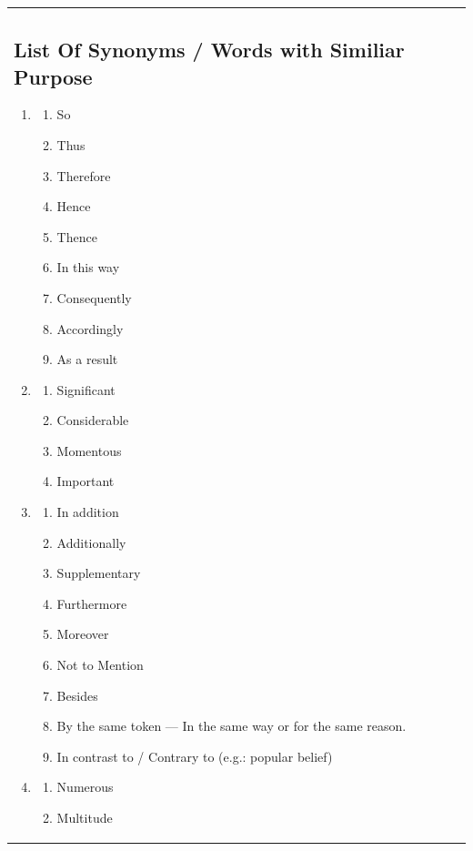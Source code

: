 \documentclass[oneside]{book}
\begin{document}
\begin{tabularx}{\textwidth}{XX}
    \subsection{List Of Synonyms / Words with Similiar Purpose }
    \begin{enumerate}
        \item \begin{enumerate}
            \item So
            \item Thus
            \item Therefore
            \item Hence
            \item Thence 
            \item In this way 
            \item Consequently
            \item Accordingly 
            \item As a result
        \end{enumerate}
        \item \begin{enumerate}
            \item Significant
            \item Considerable
            \item Momentous
            \item Important
        \end{enumerate}
        \item \begin{enumerate}
            \item In addition 
            \item Additionally
            \item Supplementary
            \item Furthermore
            \item Moreover
            \item Not to Mention 
            \item Besides
            \item By the same token --- In the same way or for the same reason.
            \item In contrast to / Contrary to (e.g.: popular belief)
        \end{enumerate}
        \item \begin{enumerate}
            \item Numerous
            \item Multitude

\end{enumerate}
\end{enumerate}
\end{tabularx}
\end{document}
